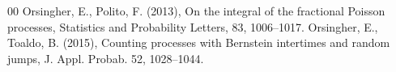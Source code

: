 \documentclass[12pt, twoside, english, headsepline]{article}
\theoremstyle{definition} %
\numberwithin{equation}{section} %
\begin{document}
{\begin{thebibliography}{00}
%
%
%
%
%
%
%
%
Orsingher, E., Polito, F. (2013),  On the integral of the fractional Poisson processes, Statistics and Probability Letters, 83, 1006--1017.
%
Orsingher, E., Toaldo, B. (2015), Counting processes with Bernstein intertimes and random jumps, J. Appl. Probab. 52, 1028--1044.
%

\end{thebibliography}}
\end{document}
